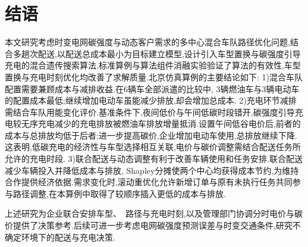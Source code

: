 \documentclass{setp-new}
\begin{document}
\section{结语}

本文研究考虑时变电网碳强度与动态客户需求的多中心混合车队路径优化问题,结合多趟次配送,以配送总成本最小为目标建立模型,设计引入车型置换与碳强度引导充电的混合遗传搜索算法.标准算例与算法组件消融实验验证了算法的有效性,车型置换与充电时刻优化均改善了求解质量.北京仿真算例的主要结论如下:
%
1)混合车队配置需要兼顾成本与减排收益.在6辆车全部派遣的比较中, 3辆燃油车与3辆电动车的配置成本最低;继续增加电动车虽能减少排放,却会增加总成本.
%
2)充电环节减排需结合车队用能变化评价.基准条件下,夜间低价与午间低碳时段错开,碳强度引导充电较无序充电减少的充电排放被燃油车排放增量抵消.设置午间低谷电价后,前者的成本与总排放均低于后者;进一步提高碳价,企业增加电动车使用,总排放继续下降.这表明,低碳充电的经济性与车型选择相互关联,电价与碳价调整需结合配送任务所允许的充电时段.
%
3)联合配送与动态调整有利于改善车辆使用和任务安排.联合配送减少车辆投入并降低成本与排放, Shapley分摊使两个中心均获得成本节约,为维持合作提供经济依据.需求变化时,滚动重优化允许新增订单与原有未执行任务共同参与路径调整,在本算例中取得了较顺序插入更低的成本与排放.

上述研究为企业联合安排车型、~路径与充电时刻,以及管理部门协调分时电价与碳价提供了决策参考.后续可进一步考虑电网碳强度预测误差与时变交通条件,研究不确定环境下的配送与充电决策.
\end{document}

